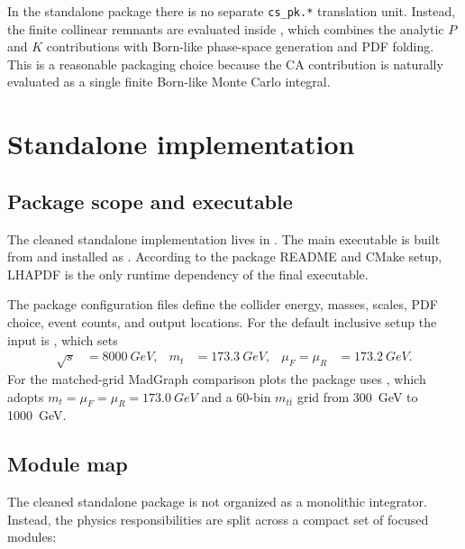 \documentclass[11pt]{article}
\begin{document}
In the standalone package there is no separate \texttt{cs\_pk.*} translation unit.
Instead, the finite collinear remnants are evaluated inside
,
which combines the analytic $P$ and $K$ contributions with Born-like phase-space generation and PDF folding.
This is a reasonable packaging choice because the CA contribution is naturally evaluated as a single finite Born-like Monte Carlo integral.

\section{Standalone implementation}

\subsection{Package scope and executable}

The cleaned standalone implementation lives in
.
The main executable is built from
and installed as
.
According to the package README and CMake setup, LHAPDF is the only runtime dependency of the final executable.

The package configuration files define the collider energy, masses, scales, PDF choice, event counts, and output locations.
For the default inclusive setup the input is
,
which sets
\begin{align}
\sqrt{s} &= \SI{8000}{GeV}, & m_t &= \SI{173.3}{GeV}, & \mu_F = \mu_R &= \SI{173.2}{GeV}.
\end{align}
For the matched-grid MadGraph comparison plots the package uses
,
which adopts $m_t=\mu_F=\mu_R=\SI{173.0}{GeV}$ and a $60$-bin $m_{t\bar t}$ grid from \SI{300}{GeV} to \SI{1000}{GeV}.

\subsection{Module map}

The cleaned standalone package is not organized as a monolithic integrator.
Instead, the physics responsibilities are split across a compact set of focused modules:
\end{document}
